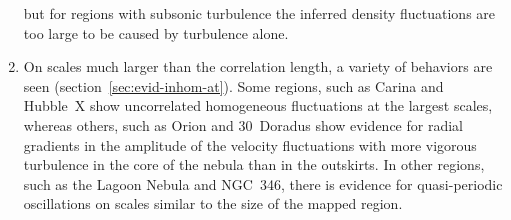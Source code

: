 \documentclass[fleqn,usenatbib, useAMS, a4paper]{mnras}
\newcounter{ionstage}
\renewcommand{\ion}[2]{\setcounter{ionstage}{#2}%
  \ensuremath{\mathrm{#1\,\scriptstyle\Roman{ionstage}}}}
\newcommand\hii{\ion{H}{2}}
\begin{document}
\begin{enumerate}[1.]
  but for regions with subsonic turbulence the inferred density fluctuations
  are too large to be caused by turbulence alone. 
\item On scales much larger than the correlation length,
  a variety of behaviors are seen (section~\ref{sec:evid-inhom-at}).
  Some regions, such as Carina and Hubble~X show uncorrelated homogeneous fluctuations
  at the largest scales, whereas others, such as Orion and 30~Doradus show evidence
  for radial gradients in the amplitude of the velocity fluctuations
  with more vigorous turbulence in the core of the nebula than in the outskirts.
  In other regions, such as the Lagoon Nebula and NGC~346, there is evidence
  for quasi-periodic oscillations on scales similar to the size
  of the mapped region. 
\end{enumerate}



\end{document}
